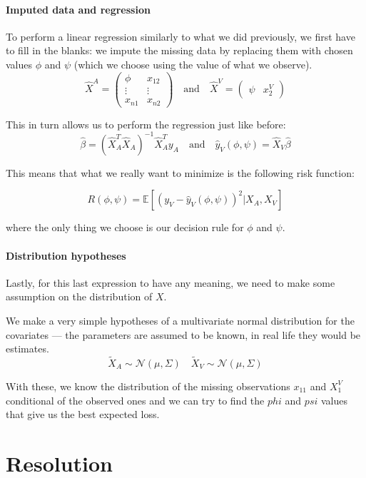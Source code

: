 \documentclass[12pt, a4paper]{article}
\begin{document}
\paragraph{Imputed data and regression}
To perform a linear regression similarly to what we did previously, we first have to fill in the blanks: we impute the missing data by replacing them with chosen values $\phi$ and $\psi$ (which we choose using the value of what we observe).
\begin{equation*}
\hat{X}^A = 
\begin{pmatrix}
\phi & x_{12} \\
\vdots & \vdots \\
x_{n1} & x_{n2}
\end{pmatrix}
\quad \mathrm{and} \quad
\hat{X}^V = 
\begin{pmatrix}
\psi & x_{2}^V
\end{pmatrix}
\end{equation*}

This in turn allows us to perform the regression just like before:
$$
\hat{\beta} = (\hat{X}_A^T \hat{X}_A)^{-1} \hat{X}_A^T y_A 
\quad \mathrm{and} \quad
\hat{y}_V (\phi, \psi) = \hat{X}_V \hat{\beta} 
$$

This means that what we really want to minimize is the following risk function:

$$R(\phi, \psi) = \mathbb{E}[(y_V - \hat{y}_V(\phi,\psi))^2 \vert X_A, X_V]$$

where the only thing we choose is our decision rule for $\phi$ and $\psi$.
\paragraph{Distribution hypotheses}
Lastly, for this last expression to have any meaning, we need to make some assumption on the distribution of $X$.

We make a very simple hypotheses of a multivariate normal distribution for the covariates --- the parameters are assumed to be known, in real life they would be estimates.
$$
\tilde{X}_A \sim \mathcal{N}(\mu, \Sigma) \quad \tilde{X}_V \sim \mathcal{N}(\mu, \Sigma)
$$

With these, we know the distribution of the missing observations $x_{11}$ and $X_1^V$ conditional of the observed ones and we can try to find the $phi$ and $psi$ values that give us the best expected loss.

\section{Resolution}
\end{document}
